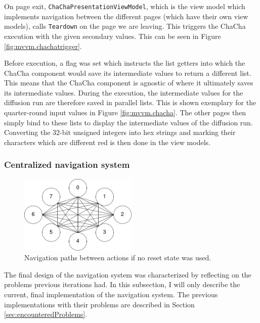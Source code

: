 On page exit, \texttt{ChaChaPresentationViewModel}, which is the view model which implements navigation between the different pages (which have their own view models), calls \texttt{Teardown} on the page we are leaving. This triggers the ChaCha execution with the given secondary values. This can be seen in Figure \ref{fig:mvvm.chachatrigger}.

Before execution, a flag was set which instructs the list getters into which the ChaCha component would save its intermediate values to return a different list. This means that the ChaCha component is agnostic of where it ultimately saves its intermediate values. During the execution, the intermediate values for the diffusion run are therefore saved in parallel lists. This is shown exemplary for the quarter-round input values in Figure \ref{fig:mvvm.chacha}. The other pages then simply bind to these lists to display the intermediate values of the diffusion run. Converting the 32-bit unsigned integers into hex strings and marking their characters which are different red is then done in the view models.

\subsubsection{Centralized navigation system}

\begin{figure}
\centering
\includegraphics[width=0.5\textwidth]{figures/navigationsystem-diagram/navigationsystem-all-overview.png}
\caption[Navigation paths (no reset state)]{Navigation paths between actions if no reset state was used.}
\label{fig:navsystem.all.overview}
\end{figure}

The final design of the navigation system was characterized by reflecting on the problems previous iterations had. In this subsection, I will only describe the current, final implementation of the navigation system. The previous implementations with their problems are described in Section \ref{sec:encounteredProblems}.

